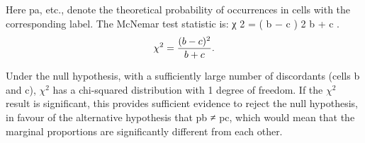 \documentclass[a4paper,12pt]{article}
\begin{document}
Here pa, etc., denote the theoretical probability of occurrences in cells with the corresponding label. 
The McNemar test statistic is: 
χ 2 = ( b − c ) 2 b + c . \[{\displaystyle \chi ^{2}={(b-c)^{2} \over b+c}.} \]

Under the null hypothesis, with a sufficiently large number of discordants (cells b and c), 
${\displaystyle \chi ^{2}} $
 has a chi-squared distribution with 1 degree of freedom. If the 
${\displaystyle \chi ^{2}} $
 result is significant, this provides sufficient evidence to reject the null hypothesis, in favour of the alternative hypothesis that pb ≠ pc, which would mean that the marginal proportions are significantly different from each other. 
\end{document}
